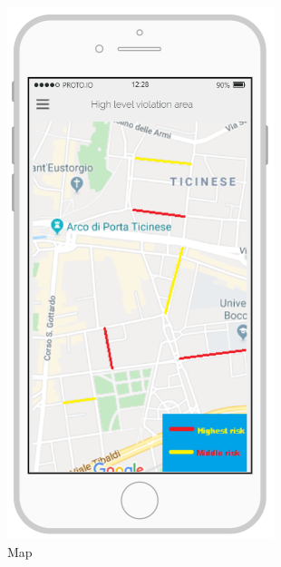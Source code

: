 \documentclass{article}
\begin{document}
\begin{figure}[H]
\begin{subfigure}[H]{0.25\linewidth}
					\includegraphics[width=\linewidth]{Images/Maps.png}
					\caption{Map}
				\end{subfigure}
				\begin{subfigure}[H]{0.25\linewidth}

\end{subfigure}
\end{figure}
\end{document}
